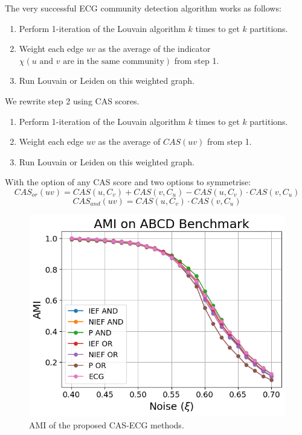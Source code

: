 \documentclass{beamer}
\begin{document}
\subtitle{Improving Partitions}

\begin{frame}{}
    The very successful ECG \citep{ecg} community detection algorithm works as follows:
    \begin{enumerate}
        \color{darkblue}
        \item Perform 1-iteration of the Louvain algorithm $k$ times to get $k$ partitions.
        \item Weight each edge $uv$ as the average of the indicator $\chi(u \text{ and } v  \text{ are in the same community})$ from step 1.
        \item Run Louvain or Leiden on this weighted graph.
    \end{enumerate}
\end{frame}
\begin{frame}{}
    We rewrite step 2 using CAS scores.
    \begin{enumerate}
        \color{darkblue}
        \item Perform 1-iteration of the Louvain algorithm $k$ times to get $k$ partitions.
        \item Weight each edge $uv$ as the average of $CAS(uv)$ from step 1.
        \item Run Louvain or Leiden on this weighted graph.
    \end{enumerate}
    With the option of any CAS score and two options to symmetrise:
    $$CAS_{or}(uv) = CAS(u, C_v) + CAS(v, C_u) - CAS(u,C_v) \cdot CAS(v,C_u)$$
    $$CAS_{and}(uv) = CAS(u,C_v) \cdot CAS(v,C_u)$$
\end{frame}
\begin{frame}{}
    \begin{figure}
        \includegraphics[height=0.8\textheight]{figures/ami-cas-ecg.png}
        \caption{AMI of the proposed CAS-ECG methods.}
    \end{figure}
\end{frame}
\end{document}
